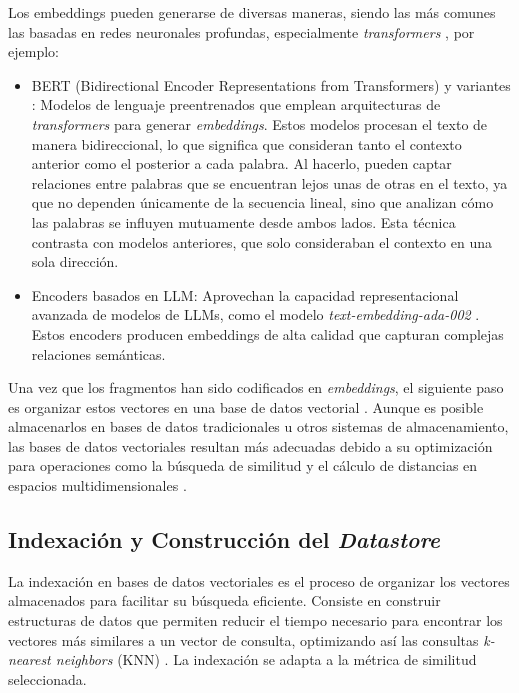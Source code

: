 \documentclass{article}
\begin{document}
Los embeddings pueden generarse de diversas maneras, siendo las más comunes las basadas en redes neuronales profundas, especialmente \textit{transformers} \cite{vaswani2017attention}, por ejemplo:

\begin{itemize} 
    \item BERT (Bidirectional Encoder Representations from Transformers) y variantes \cite{rajaraman2011data}: Modelos de lenguaje preentrenados que emplean arquitecturas de \textit{transformers} para generar \textit{embeddings}. Estos modelos procesan el texto de manera bidireccional, lo que significa que consideran tanto el contexto anterior como el posterior a cada palabra. Al hacerlo, pueden captar relaciones entre palabras que se encuentran lejos unas de otras en el texto, ya que no dependen únicamente de la secuencia lineal, sino que analizan cómo las palabras se influyen mutuamente desde ambos lados. Esta técnica contrasta con modelos anteriores, que solo consideraban el contexto en una sola dirección.
    \item Encoders basados en LLM: Aprovechan la capacidad representacional avanzada de modelos de LLMs, como el modelo \textit{text-embedding-ada-002} \cite{openai2022textembada}. Estos encoders producen embeddings de alta calidad que capturan complejas relaciones semánticas.
\end{itemize}

Una vez que los fragmentos han sido codificados en \textit{embeddings}, el siguiente paso es organizar estos vectores en una base de datos vectorial \cite{wu2024retrievalaugmentedgenerationnaturallanguage}. Aunque es posible almacenarlos en bases de datos tradicionales u otros sistemas de almacenamiento, las bases de datos vectoriales resultan más adecuadas debido a su optimización para operaciones como la búsqueda de similitud y el cálculo de distancias en espacios multidimensionales \cite{han2023comprehensivesurveyvectordatabase}.

\subsection{Indexación y Construcción del \textit{Datastore}}

La indexación en bases de datos vectoriales es el proceso de organizar los vectores almacenados para facilitar su búsqueda eficiente. Consiste en construir estructuras de datos que permiten reducir el tiempo necesario para encontrar los vectores más similares a un vector de consulta, optimizando así las consultas \textit{k-nearest neighbors} (KNN) \cite{johnson2021billion}. La indexación se adapta a la métrica de similitud seleccionada.
\end{document}
